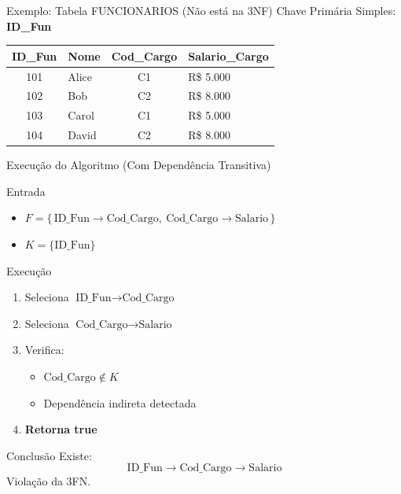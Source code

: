 \documentclass[9pt]{beamer}
\begin{document}
\begin{frame}{Exemplo: Tabela FUNCIONARIOS (Não está na 3NF)}
  \small
  Chave Primária Simples: \textbf{ID\_Fun}
  \vspace{0.2cm}
  \centering
  \begin{tabular}{|c|l|c|l|}
    \hline
    \textbf{ID\_Fun} & \textbf{Nome} & \textbf{Cod\_Cargo} & \textbf{Salario\_Cargo} \\ \hline
    101 & Alice   & C1 & \color{red}R\$ 5.000 \\ \hline
    102 & Bob     & C2 & \color{red}R\$ 8.000 \\ \hline
    103 & Carol   & C1 & \color{red}R\$ 5.000 \\ \hline
    104 & David   & C2 & \color{red}R\$ 8.000 \\ \hline
  \end{tabular}
\end{frame}

\begin{frame}{Execução do Algoritmo (Com Dependência Transitiva)}
\small

\begin{block}{Entrada}
\begin{itemize}
    \item $F = \{\, \text{ID\_Fun} \to \text{Cod\_Cargo},\ \text{Cod\_Cargo} \to \text{Salario} \,\}$
    \item $K = \{\text{ID\_Fun}\}$
\end{itemize}
\end{block}

\vspace{0.3cm}

\begin{block}{Execução}
\begin{enumerate}
    \item Seleciona $\text{ID\_Fun} \to \text{Cod\_Cargo}$
    \item Seleciona $\text{Cod\_Cargo} \to \text{Salario}$

    \item Verifica:
    \begin{itemize}
        \item $\text{Cod\_Cargo} \notin K$ \checkmark
        \item Dependência indireta detectada \checkmark
    \end{itemize}

    \item \textbf{Retorna true}
\end{enumerate}
\end{block}

\begin{alertblock}{Conclusão}
Existe:
\[
\text{ID\_Fun} \to \text{Cod\_Cargo} \to \text{Salario}
\]
Violação da 3FN.
\end{alertblock}

\end{frame}
\end{document}
